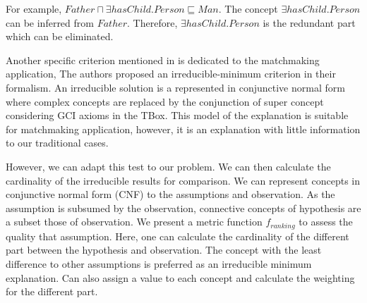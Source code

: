 \documentclass{article}
\newtheorem{mydef}{Definition}
\begin{document}
For example, $Father \sqcap \exists hasChild.Person \sqsubseteq Man$. The concept $\exists hasChild.Person$ can be inferred from $Father$.
Therefore, $\exists hasChild.Person$ is the redundant part which can be eliminated. 
 


Another specific criterion mentioned in \cite{di2007semantic} is dedicated to the matchmaking application,
The authors proposed an irreducible-minimum criterion in their formalism.
An irreducible solution is a represented in conjunctive normal form where complex concepts are replaced by the conjunction of super concept
considering GCI axioms in the TBox.
This model of the explanation is suitable for matchmaking application, however, it is an explanation with little information to our traditional cases.

However, we can adapt this test to our problem. We can then calculate the cardinality of the irreducible results for comparison.
We can represent concepts in conjunctive normal form (CNF) to the assumptions and observation. As the assumption is subsumed by the observation, connective concepts of hypothesis are a subset
those of observation. We present a metric function $ f_{ranking}$  to assess the quality that assumption. Here, one can calculate the cardinality of the different part
between the hypothesis and observation. The concept with the least difference to other assumptions is preferred as an irreducible minimum explanation. Can also
assign a value to each concept and calculate the weighting for the different part.
\end{document}
